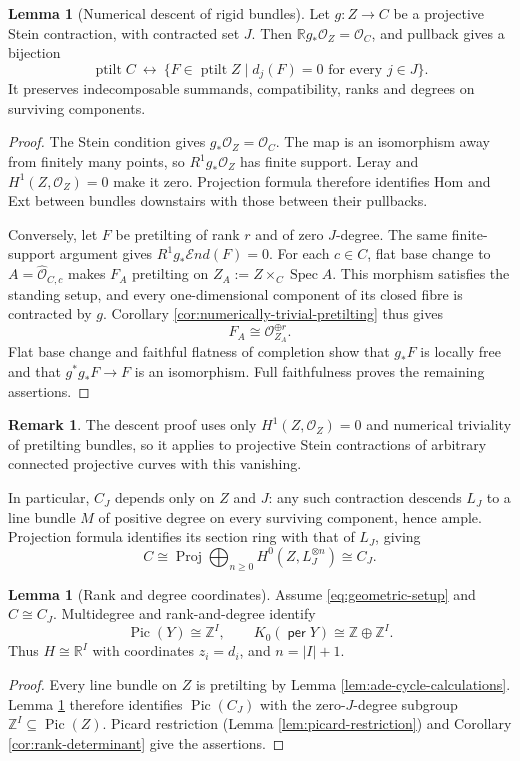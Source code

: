 \documentclass[a4paper,reqno]{amsart}
\def\O{\mathcal{O}}
\DeclareMathOperator{\per}{\mathsf{per}}
\DeclareMathOperator{\Spec}{Spec}
\DeclareMathOperator{\Pic}{Pic}
\DeclareMathOperator{\ptilt}{ptilt}
\theoremstyle{definition}
\newtheorem{Lem}[Thm]{Lemma}
\newtheorem{Rem}[Thm]{Remark}
\begin{document}
\begin{Lem}[Numerical descent of rigid bundles]\label{lem:ade-rigid-descent}
Let $g:Z\to C$ be a projective Stein contraction, with contracted set $J$. Then $\mathbb Rg_*\O_Z=\O_C$, and pullback gives a bijection
\[
\ptilt C\ \longleftrightarrow\
\{F\in\ptilt Z\mid d_j(F)=0\text{ for every }j\in J\}.
\]
It preserves indecomposable summands, compatibility, ranks and degrees on surviving components.
\end{Lem}
\begin{proof}
The Stein condition gives $g_*\O_Z=\O_C$. The map is an isomorphism away from finitely many points, so $R^1g_*\O_Z$ has finite support. Leray and $H^1(Z,\O_Z)=0$ make it zero. Projection formula therefore identifies Hom and Ext between bundles downstairs with those between their pullbacks.

Conversely, let $F$ be pretilting of rank $r$ and of zero $J$-degree. The same finite-support argument gives $R^1g_*\mathcal End(F)=0$. For each $c\in C$, flat base change to $A=\widehat{\O}_{C,c}$ makes $F_A$ pretilting on $Z_A:=Z\times_C\Spec A$. This morphism satisfies the standing setup, and every one-dimensional component of its closed fibre is contracted by $g$. Corollary \ref{cor:numerically-trivial-pretilting} thus gives
\[
F_A\cong\O_{Z_A}^{\oplus r}.
\]
Flat base change and faithful flatness of completion show that $g_*F$ is locally free and that $g^*g_*F\to F$ is an isomorphism. Full faithfulness proves the remaining assertions.
\end{proof}

\begin{Rem}\label{rem:ade-stein-uniqueness}
The descent proof uses only $H^1(Z,\O_Z)=0$ and numerical triviality of pretilting bundles, so it applies to projective Stein contractions of arbitrary connected projective curves with this vanishing.

In particular, $C_J$ depends only on $Z$ and $J$: any such contraction descends $L_J$ to a line bundle $M$ of positive degree on every surviving component, hence ample. Projection formula identifies its section ring with that of $L_J$, giving
\[
C\cong\operatorname{Proj}\bigoplus_{n\ge0}H^0(Z,L_J^{\otimes n})\cong C_J.
\]
\end{Rem}

\begin{Lem}[Rank and degree coordinates]\label{lem:ade-numerical-coordinates}
Assume \eqref{eq:geometric-setup} and $C\cong C_J$. Multidegree and rank-and-degree identify
\[
\Pic(Y)\cong\mathbb Z^I,\qquad
K_0(\per Y)\cong\mathbb Z\oplus\mathbb Z^I.
\]
Thus $H\cong\mathbb R^I$ with coordinates $z_i=d_i$, and $n=|I|+1$.
\end{Lem}
\begin{proof}
Every line bundle on $Z$ is pretilting by Lemma \ref{lem:ade-cycle-calculations}. Lemma \ref{lem:ade-rigid-descent} therefore identifies $\Pic(C_J)$ with the zero-$J$-degree subgroup $\mathbb Z^I\subseteq\Pic(Z)$. Picard restriction (Lemma \ref{lem:picard-restriction}) and Corollary \ref{cor:rank-determinant} give the assertions.
\end{proof}
\end{document}
